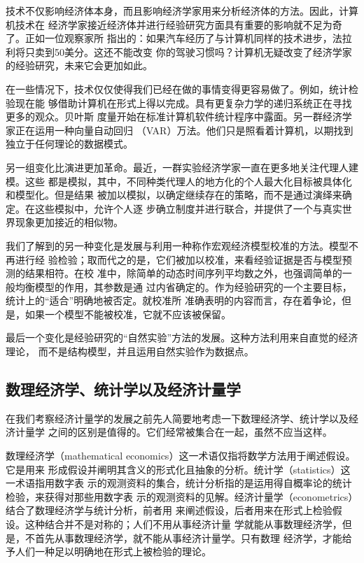 技术不仅影响经济体本身，而且影响经济学家用来分析经济体的方法。因此，计算机技术在
经济学家接近经济体并进行经验研究方面具有重要的影响就不足为奇了。正如一位观察家所
指出的：如果汽车经历了与计算机同样的技术进步，法拉利将只卖到50美分。这还不能改变
你的驾驶习惯吗？计算机无疑改变了经济学家的经验研究，未来它会更加如此。

在一些情况下，技术仅仅使得我们已经在做的事情变得更容易做了。例如，统计检验现在能
够借助计算机在形式上得以完成。具有更复杂力学的递归系统正在寻找更多的观众。贝叶斯
度量开始在标准计算机软件统计程序中露面。另一群经济学家正在运用一种向量自动回归
（VAR）万法。他们只是照看着计算机，以期找到独立于任何理论的数据模式。

另一组变化比演进更加革命。最近，一群实验经济学家一直在更多地关注代理人建模。这些
都是模拟，其中，不同种类代理人的地方化的个人最大化目标被具体化和模型化。但是结果
被加以模拟，以确定继续存在的策略，而不是通过演绎来确定。在这些模拟中，允许个人逐
步确立制度并进行联合，并提供了一个与真实世界现象更加接近的相似物。

我们了解到的另一种变化是发展与利用一种称作宏观经济模型校准的方法。模型不再进行经
验检验；取而代之的是，它们被加以校准，来看经验证据是否与模型预测的结果相符。在校
准中，除简单的动态时间序列平均数之外，也强调简单的一般均衡模型的作用，其参数是通
过内省确定的。作为经验研究的一个主要目标，统计上的“适合”明确地被否定。就校准所
准确表明的内容而言，存在着争论，但是，如果一个模型不能被校准，它就不应该被保留。

最后一个变化是经验研究的“自然实验”方法的发展。这种方法利用来自直觉的经济理论，
而不是结构模型，并且运用自然实验作为数据点。

\subsection{数理经济学、统计学以及经济计量学}

在我们考察经济计量学的发展之前先人简要地考虑一下数理经济学、统计学以及经济计量学
之间的区别是值得的。它们经常被集合在一起，虽然不应当这样。

数理经济学（mathematical economics）这一术语仅指将数学方法用于阐述假设。它是用来
形成假设并阐明其含义的形式化且抽象的分析。统计学（statistics）这一术语指用数字表
示的观测资料的集合，统计分析指的是运用得自概率论的统计检验，来获得对那些用数字表
示的观测资料的见解。经济计量学（econometrics）结合了数理经济学与统计分析，前者用
来阐述假设，后者用来在形式上检验假设。这种结合并不是对称的；人们不用从事经济计量
学就能从事数理经济学，但是，不首先从事数理经济学，就不能从事经济计量学。只有数理
经济学，才能给予人们一种足以明确地在形式上被检验的理论。

